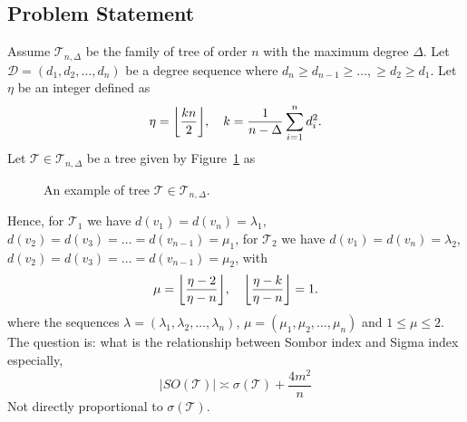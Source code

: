 \documentclass[12pt, a4paper]{article}
\newcommand{\TT}{\mathcal{T}}
\DeclarePairedDelimiter\floor{\lfloor}{\rfloor}
\begin{document}
\subsection{Problem Statement}
Assume $\TT_{n,\Delta}$ be the family of tree of order $n$ with the maximum degree $\Delta$. Let $\mathscr{D}=(d_1,d_2,\dots,d_n)$ be a degree sequence where $d_n\geqslant d_{n-1}\geqslant \dots,\geqslant d_2\geqslant d_1$. Let $\eta$ be an integer defined as 
\begin{equation}
\eta=\floor*{\frac{kn}{2}}, \quad k=\frac{1}{n-\Delta}\sum_{i=1}^{n}d_i^2.
\end{equation}
Let $\TT\in \TT_{n,\Delta}$ be a tree given by Figure~\ref{familytren01r} as 
\begin{figure}[H]
    \centering
\caption{An example of tree $\TT\in \TT_{n,\Delta}$.}
\label{familytren01r}
\end{figure}
Hence, for $\TT_1$ we have $d(v_1)=d(v_n)=\lambda_1$, $d(v_2)=d(v_3)=\dots=d(v_{n-1})=\mu_1$, for $\TT_2$ we have $d(v_1)=d(v_n)=\lambda_2$, $d(v_2)=d(v_3)=\dots=d(v_{n-1})=\mu_2$, with 
\begin{equation}
\mu=\floor*{\frac{\eta-2}{\eta-n}}, \quad \floor*{\frac{\eta-k}{\eta-n}}=1.
\end{equation}
where the sequences $\lambda=(\lambda_1,\lambda_2,\dots,\lambda_n)$, $\mu=(\mu_1,\mu_2,\dots,\mu_n)$ and $1\leqslant \mu \leqslant 2$. The question is: what is the relationship between Sombor index and Sigma index especially, 
\[
|SO(\TT)|\asymp \sigma(\TT)+\frac{4m^2}{n}
\]
Not directly proportional to $\sigma(\TT)$.
\end{document}
